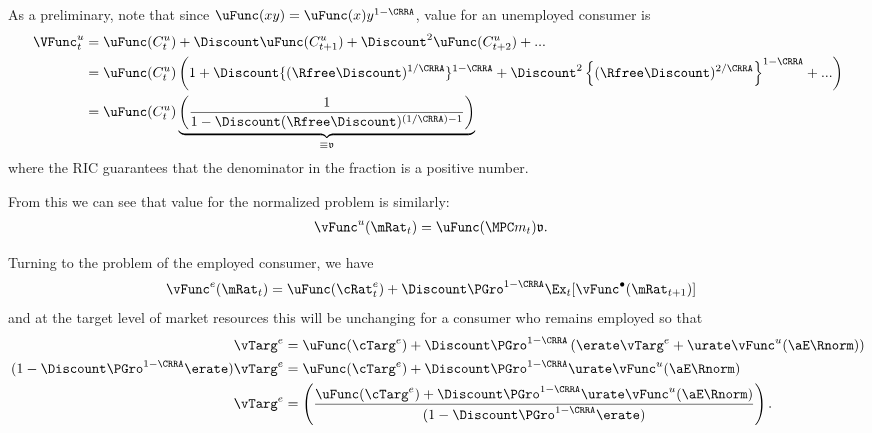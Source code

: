 \documentclass{\handout}
\begin{document}
As a preliminary, note that since $\uFunc(xy)=\uFunc(x)y^{1-\CRRA}$, value for an unemployed consumer is 
\begin{equation}\begin{gathered}\begin{aligned}
  \VFunc_{t}^{u} & =  \uFunc(C_{t}^{u})+\Discount \uFunc(C_{t+1}^{u}) + \Discount^{2} \uFunc(C_{t+2}^{u})+...
\\ & =  \uFunc(C_{t}^{u})\left(1+\Discount \{(\Rfree \Discount)^{1/\CRRA}\}^{1-\CRRA} + \Discount^{2}\left\{(\Rfree \Discount)^{2/\CRRA}\right\}^{1-\CRRA}+...\right)
\\ & =  \uFunc(C_{t}^{u})\underbrace{\left(\frac{1}{1-\Discount (\Rfree \Discount)^{(1/\CRRA)-1}}\right)}_{\equiv \mathfrak{v}}
\end{aligned}\end{gathered}\end{equation}
where the RIC guarantees that the denominator in the fraction is a positive number.  

From this we can see that value for the normalized problem is similarly:
\begin{equation}\begin{gathered}\begin{aligned}
  \vFunc^{u}(\mRat_{t}) & =  \uFunc(\MPCU m_{t}) \mathfrak{v}
.
\end{aligned}\end{gathered}\end{equation}

Turning to the problem of the employed consumer, we have
\begin{equation}\begin{gathered}\begin{aligned}
  \vFunc^{e}(\mRat_{t}) & =  \uFunc({\cRat}^{e}_{t})+\Discount \PGro^{1-\CRRA} \Ex_{t}[\vFunc^{\bullet}(\mRat_{t+1})]
\end{aligned}\end{gathered}\end{equation}
and at the target level of market resources this will be unchanging for a consumer who
remains employed so that 
\begin{equation}\begin{gathered}\begin{aligned}
  \vTarg^{e} & =  \uFunc(\cTarg^{e})+\Discount \PGro^{1-\CRRA} \left(\erate \vTarg^{e} + \urate \vFunc^{u}(\aE \Rnorm)\right)
\\ (1-\Discount \PGro^{1-\CRRA} \erate) \vTarg^{e} & =  \uFunc(\cTarg^{e})+\Discount \PGro^{1-\CRRA} \urate \vFunc^{u}(\aE \Rnorm)
\\ \vTarg^{e} & =  \left(\frac{\uFunc(\cTarg^{e})+\Discount \PGro^{1-\CRRA} \urate \vFunc^{u}(\aE \Rnorm)}{(1-\Discount \PGro^{1-\CRRA} \erate) }\right)
.
\end{aligned}\end{gathered}\end{equation}
\end{document}
